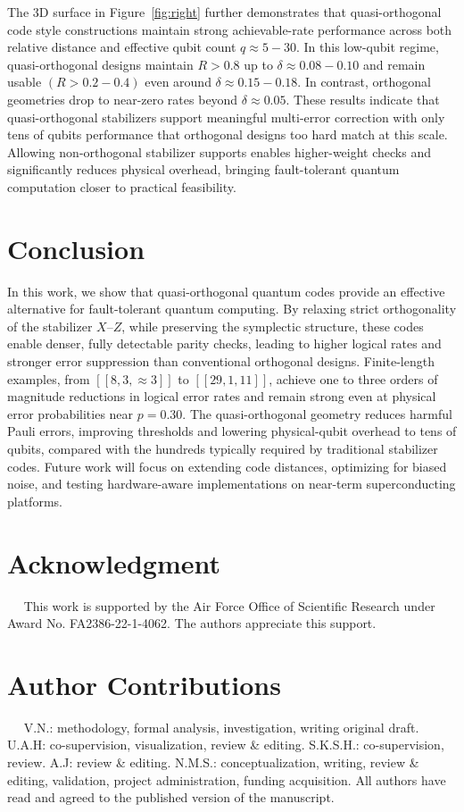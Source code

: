 \documentclass{iopjournal}
\theoremstyle{thmstyleone}%
\theoremstyle{thmstyletwo}%
\theoremstyle{thmstylethree}%
\begin{document}
The 3D surface in Figure~\ref{fig:right} further demonstrates that quasi-orthogonal code style constructions maintain strong achievable-rate performance across both relative distance and effective qubit count \(q \approx 5{-}30\). In this low-qubit regime, quasi-orthogonal designs maintain  \(R>0.8\) up to \(\delta \approx 0.08{-}0.10\) and remain usable \((R>0.2{-}0.4)\) even around 
\(\delta \approx 0.15{-}0.18\). In contrast, orthogonal geometries drop to near-zero rates beyond \(\delta \approx 0.05\). These results indicate that quasi-orthogonal stabilizers support meaningful multi-error correction with only tens of qubits performance that orthogonal designs too hard match at 
this scale. Allowing non-orthogonal stabilizer supports enables higher-weight checks and significantly 
reduces physical overhead, bringing fault-tolerant quantum computation closer to practical feasibility.


\section{Conclusion}\label{Section IV}

In this work, we show that quasi-orthogonal quantum codes provide an effective alternative for fault-tolerant quantum computing. By relaxing strict orthogonality of the stabilizer \(X\)–\(Z\), while preserving the symplectic structure, these codes enable denser, fully detectable parity checks, leading to higher logical rates and stronger error suppression than conventional orthogonal designs.
Finite-length examples, from \([[8,3,\approx 3]]\) to \([[29,1,11]]\), achieve one to three orders of magnitude reductions in logical error rates and remain strong even at physical error probabilities near \(p=0.30\). The quasi-orthogonal geometry reduces harmful Pauli errors, improving thresholds and lowering physical-qubit overhead to tens of qubits, compared with the hundreds typically required by traditional stabilizer codes. Future work will focus on extending code distances, optimizing for biased noise, and testing hardware-aware implementations on near-term superconducting platforms.

 \section*{Acknowledgment}~~
 This work is supported by the Air Force Office of Scientific Research under Award No. FA2386-22-1-4062. The authors appreciate this support.

 \section*{Author Contributions}~~ V.N.: methodology, formal analysis, investigation, writing original draft. U.A.H: co-supervision, visualization, review \& editing. S.K.S.H.: co-supervision, review. A.J: review \& editing. N.M.S.: conceptualization, writing,  review \& editing, validation, project administration, funding acquisition. All authors have read and agreed to the published version of the manuscript.
 
\end{document}
